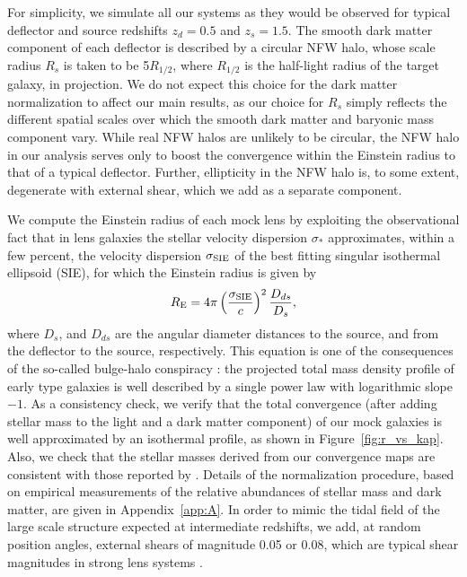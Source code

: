 For simplicity, we simulate all our systems as they would be observed for typical deflector and source redshifts $z_{d}=0.5$ and $z_{s}=1.5$. The smooth dark matter component of each deflector is described by a circular NFW halo, whose scale radius $R_s$ is taken to be 5$R_{1/2}$, where $R_{1/2}$ is the half-light radius of the target galaxy, in projection. We do not expect this choice for the dark matter normalization to affect our main results, as our choice for $R_s$ simply reflects the different spatial scales over which the smooth dark matter and baryonic mass component vary. While real NFW halos are unlikely to be circular, the NFW halo in our analysis serves only to boost the convergence within the Einstein radius to that of a typical deflector. Further, ellipticity in the NFW halo is, to some extent, degenerate with external shear, which we add as a separate component.

We compute the Einstein radius of each mock lens by exploiting the observational fact \cite{Tre++06,Koopmans++09} that in lens galaxies the stellar velocity dispersion $\sigma_*$ approximates, within a few percent, the velocity dispersion $\sigma_{\rm{SIE}}$ of the best fitting singular isothermal ellipsoid (SIE), for which the Einstein radius is given by
\begin{equation}
R_{\rm E} = 4\pi\left(\frac{\sigma_{\rm{SIE}}}{c}\right)^2\frac{D_{ds}}{D_s},
\end{equation} 
where $D_s$, and $D_{ds}$ are the angular diameter distances to the source, and from the deflector to the source, respectively. This equation is one of the consequences of the so-called bulge-halo conspiracy \cite{TreuKoopmans02,TreuKoopmans04,Koopmans++06,Koopmans++09,DuttonTreu14}: the projected total mass density profile of early type galaxies is well described by a single power law with logarithmic slope $-1$. As a consistency check, we verify that the total convergence (after adding stellar mass to the light and a dark matter component) of our mock galaxies is well approximated by an isothermal profile, as shown in Figure~\ref{fig:r_vs_kap}. Also, we check that the stellar masses derived from our convergence maps are consistent with those reported by \cite{Gallo++08}. Details of the normalization procedure, based on empirical measurements of the relative abundances of stellar mass and dark matter, are given in Appendix~\ref{app:A}. 
In order to mimic the tidal field of the large scale structure expected at intermediate redshifts, we add, at random position angles, external shears of magnitude 0.05 or 0.08, which are typical shear magnitudes in strong lens systems \cite{HolderSchechter033}. 
